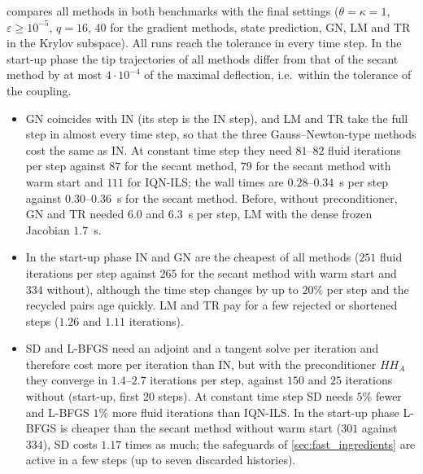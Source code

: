 \documentclass[11pt,a4paper]{article}
\theoremstyle{definition}
\theoremstyle{remark}
\begin{document}
 compares all methods in both benchmarks with the final settings
($\theta=\kappa=1$, $\varepsilon\ge10^{-5}$, $q=16$, $40$ for the gradient methods, state prediction,
GN, LM and TR in the Krylov subspace). All runs reach the tolerance in every time step. In the
start-up phase the tip trajectories of all methods differ from that of the secant method by at most
$4\cdot10^{-4}$ of the maximal deflection, i.e.\ within the tolerance of the coupling.
\begin{itemize}
\item GN coincides with IN (its step is the IN step), and LM and TR take the full step in almost
every time step, so that the three Gauss--Newton-type methods cost the same as IN. At constant time
step they need $81$--$82$ fluid iterations per step against $87$ for the secant method, $79$ for the
secant method with warm start and $111$ for IQN-ILS; the wall times are $0.28$--$0.34$~s per step
against $0.30$--$0.36$~s for the secant method. Before, without preconditioner, GN and TR needed
$6.0$ and $6.3$~s per step, LM with the dense frozen Jacobian $1.7$~s.
\item In the start-up phase IN and GN are the cheapest of all methods ($251$ fluid iterations per
step against $265$ for the secant method with warm start and $334$ without), although the time step
changes by up to $20\%$ per step and the recycled pairs age quickly. LM and TR pay for a few
rejected or shortened steps ($1.26$ and $1.11$ iterations).
\item SD and L-BFGS need an adjoint and a tangent solve per iteration and therefore cost more per
iteration than IN, but with the preconditioner $HH_A$ they converge in $1.4$--$2.7$ iterations
per step, against $150$ and $25$ iterations without (start-up, first $20$ steps). At constant time
step SD needs $5\%$ fewer and L-BFGS $1\%$ more fluid iterations than IQN-ILS. In the start-up
phase L-BFGS is cheaper than the secant method without warm start ($301$ against $334$), SD costs
$1.17$ times as much; the safeguards of \cref{sec:fast_ingredients} are active in a few steps
(up to seven discarded histories).
\end{itemize}
\end{document}
